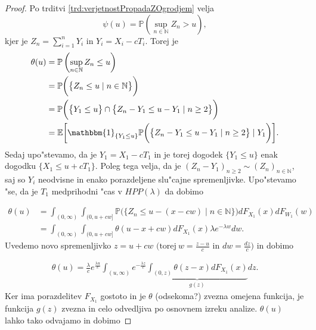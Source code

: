 \documentclass[12pt, a4paper, reqno]{amsart}
\theoremstyle{definition}
\theoremstyle{plain}
\newcommand{\N}{\mathbb{N}}
\newcommand{\E}{\mathbb{E}}
\newcommand{\Prob}{\mathbb{P}}
\newcommand{\1}{\mathds{1}}
\begin{document}
            \begin{proof}
                Po trditvi \ref{trd:verjetnostPropadaZOgrodjem} velja
                \begin{equation*}
                    \psi(u) = \Prob\left(\sup_{n\in\N}Z_n > u\right),
                \end{equation*}
                kjer je $Z_n = \sum_{i=1}^nY_i$ in $Y_i = X_i - cT_i$. Torej je
                \begin{align*}
                    \theta(u) &= \Prob\left(\sup_{n\in\N}Z_n \leq u\right) \\
                              &= \Prob\biggl(\bigl\{Z_n \leq u\mid n\in\N\bigr\}\biggr) \\
                              &= \Prob\biggl(\bigl\{Y_1 \leq u\bigr\}\cap \bigl\{Z_n - Y_1 \leq u - Y_1\mid n\geq2\bigr\}\biggr) \\
                              &= \E\biggl[\mathbbm{1}_{\{Y_1\leq u\}}\Prob\biggl(\bigl\{Z_n - Y_1 \leq u - Y_1\mid n\geq2\bigr\}\mid Y_1\biggr)\biggr].
                \end{align*}
                Sedaj upo"stevamo, da je $Y_1 = X_1 - cT_1$ in je torej dogodek $\{Y_1 \leq u\}$ 
                enak dogodku $\{X_1 \leq u + cT_1\}$. Poleg tega velja, da je 
                $(Z_n - Y_1)_{n\geq2} \sim (Z_n)_{n\in\N}$, saj so $Y_i$ neodvisne in enako porazdeljene
                slu"cajne spremenljivke.
                Upo"stevamo "se, da je  $T_1$ medprihodni "cas v $HPP(\lambda)$ da dobimo

                \begin{align*}
                        \theta(u)   &= \int_{(0, \infty)}\int_{(0, u + cw]}\Prob\biggl(\bigl\{Z_n \leq u - (x - cw)\mid n\in\N\bigr\}\biggr)dF_{X_1}(x)dF_{W_1}(w) \\
                                    &= \int_{(0, \infty)}\int_{(0, u + cw]}\theta(u - x + cw)dF_{X_1}(x)\lambda e^{-\lambda w}dw.
                \end{align*}
                Uvedemo novo spremenljivko $z = u + cw$ $\bigl( \text{torej} \ w = \tfrac{z - u}{c}$ in $dw = \tfrac{dz}{c} \bigr)$ 
                in dobimo

                \begin{align*}
                            \theta(u) = \frac{\lambda}{c}e^{\frac{\lambda u}{c}}\int_{(u, \infty)}e^{-\frac{\lambda z}{c}}\underbrace{\int_{(0, z)}\theta(z - x)dF_{X_1}(x)}_{g(z)}dz.
                \end{align*}
                Ker ima porazdelitev $F_{X_1}$ gostoto in je $\theta$ (odsekoma?) zvezna omejena funkcija,
                je funkcija $g(z)$ zvezna in celo odvedljiva po osnovnem izreku analize.
                $\theta(u)$ lahko tako odvajamo in dobimo


\end{proof}
\end{document}
